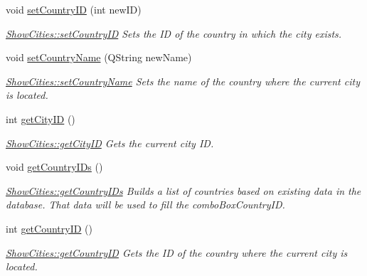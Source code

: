 \begin{DoxyCompactItemize}
void \mbox{\hyperlink{class_show_cities_a853a958ebc2c0d42d872c237d431fe25}{set\+Country\+ID}} (int new\+ID)
\begin{DoxyCompactList}\small\item\em \mbox{\hyperlink{class_show_cities_a853a958ebc2c0d42d872c237d431fe25}{Show\+Cities\+::set\+Country\+ID}} Sets the ID of the country in which the city exists. \end{DoxyCompactList}\item 
void \mbox{\hyperlink{class_show_cities_a6974ab22950cede9fb290490bcc8f3a5}{set\+Country\+Name}} (Q\+String new\+Name)
\begin{DoxyCompactList}\small\item\em \mbox{\hyperlink{class_show_cities_a6974ab22950cede9fb290490bcc8f3a5}{Show\+Cities\+::set\+Country\+Name}} Sets the name of the country where the current city is located. \end{DoxyCompactList}\item 
int \mbox{\hyperlink{class_show_cities_ac81b38d6862643619d07f82fe12b5c02}{get\+City\+ID}} ()
\begin{DoxyCompactList}\small\item\em \mbox{\hyperlink{class_show_cities_ac81b38d6862643619d07f82fe12b5c02}{Show\+Cities\+::get\+City\+ID}} Gets the current city ID. \end{DoxyCompactList}\item 
\mbox{\label{class_show_cities_a8fa42e8a5b12579cd04ae2a8ee4a9370}} 
void \mbox{\hyperlink{class_show_cities_a8fa42e8a5b12579cd04ae2a8ee4a9370}{get\+Country\+I\+Ds}} ()
\begin{DoxyCompactList}\small\item\em \mbox{\hyperlink{class_show_cities_a8fa42e8a5b12579cd04ae2a8ee4a9370}{Show\+Cities\+::get\+Country\+I\+Ds}} Builds a list of countries based on existing data in the database. That data will be used to fill the combo\+Box\+Country\+ID. \end{DoxyCompactList}\item 
int \mbox{\hyperlink{class_show_cities_a8f66380734928e926a732a0088c1d998}{get\+Country\+ID}} ()
\begin{DoxyCompactList}\small\item\em \mbox{\hyperlink{class_show_cities_a8f66380734928e926a732a0088c1d998}{Show\+Cities\+::get\+Country\+ID}} Gets the ID of the country where the current city is located. \end{DoxyCompactList}\item 

\end{DoxyCompactItemize}
